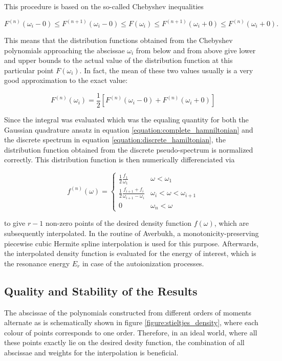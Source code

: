 This procedure is based on the so-called Chebyshev inequalities

\begin{equation} \label{equation:Chebyshev_inequalities}
  F^{(n)}(\omega_i - 0) \le F^{(n+1)}(\omega_i - 0) \le F(\omega_i)
  \le F^{(n+1)}(\omega_i + 0) \le F^{(n)}(\omega_i + 0).
\end{equation}

This means that the distribution functions obtained from the Chebyshev
polynomials approaching the abscissae $\omega_i$ from below and from above
give lower and upper bounds to the actual value of the distribution
function at this particular point $F(\omega_i)$. In fact, the mean of these
two values usually is a very good approximation to the exact value:

\begin{equation}
  F^{(n)} (\omega_i) = \frac 12 \left[ F^{(n)} (\omega_i - 0)
                       + F^{(n)} (\omega_i+0) \right]
\end{equation}

Since the integral was evaluated
which was the equaling quantity for both the Gaussian quadrature ansatz
in equation \ref{equation:complete_hamniltonian} and the discrete spectrum in equation
\ref{equation:discrete_hamiltonian}, the distribution function obtained from the
discrete pseudo-spectrum is normalized correctly.
This distribution function is then numerically differenciated via

\begin{equation}
  f^{(n)} (\omega) =
  \begin{cases}
    \frac 12 \frac{f_1}{\omega_1}    & \omega < \omega_1\\
    \frac 12 \frac{f_{i+1} + f_i}{\omega_{i+1} - \omega_i}
                                     & \omega_i < \omega < \omega_{i+1}\\
    0                                & \omega_n < \omega
  \end{cases}
\end{equation}

to give  $r-1$ non-zero points of the desired
density function $f(\omega)$, which are
subsequently interpolated. In the routine of Averbukh, a 
monotonicity-preserving piecewise cubic Hermite spline interpolation
is used for this purpose. Afterwards, the interpolated density function is evaluated
for the energy of interest, which is the resonance energy $E_r$ in case of the
autoionization processes.

\subsection{Quality and Stability of the Results} \label{section:quality_stieltjes}
The abscissae of the polynomials constructed from different orders
of moments alternate as is schematically shown in
figure \ref{figure:stieltjes_density}, where each colour of points corresponds
to one order. Therefore, in an ideal world, where all these points exactly lie
on the desired desity function, the combination of all abscissae
and weights for the interpolation is beneficial.

